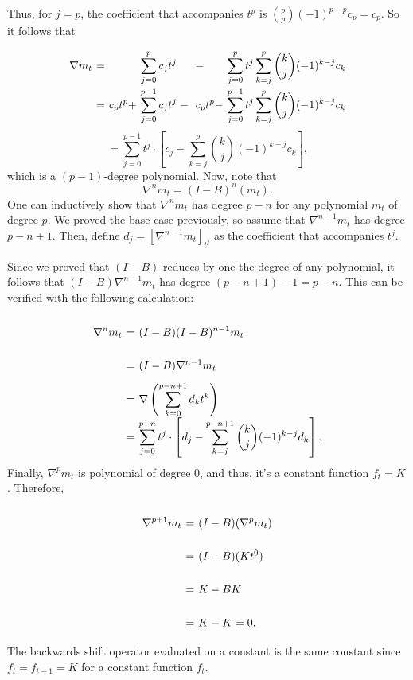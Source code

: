 Thus, for $j = p$, the coefficient that accompanies $t^p$ is $\binom{p}{p}(-1)^{p-p} c_p = c_p$. So it follows that
\[ \everymath{\displaystyle}
\arraycolsep=1.8pt\def\arraystretch{2.5}
\begin{array}{rcllll}
    \nabla m_t & = &  & \sum_{j = 0}^{p}c_j t^{j}  & - & \sum_{j = 0}^{p} t^j \sum_{k = j}^{p} \binom{k}{j} (-1)^{k-j} c_k\\
    & = & c_p t^p + & \sum_{j = 0}^{p-1}c_j t^{j} \; - \; & c_p t^p - & \sum_{j = 0}^{p-1} t^j \sum_{k = j}^{p} \binom{k}{j} (-1)^{k-j} c_k\\
\end{array}  \]
\[ = \sum_{j = 0}^{p-1} t^j \cdot \left[ c_j - \sum_{k = j}^{p} \binom{k}{j} (-1)^{k-j} c_k \right], \]
which is a $(p-1)$-degree polynomial. Now, note that
\[ \nabla^{n} m_{t} = (I-B)^{n}(m_t). \]
One can inductively show that $\nabla^n m_t$ has degree $p-n$ for any polynomial $m_t$ of degree $p$. We proved the base case previously, so assume that $\nabla^{n-1} m_t$ has degree $p-n+1$. Then, define $d_j = [\nabla^{n-1} m_t]_{t^j}$ as the coefficient that accompanies $t^j$. 

Since we proved that $(I-B)$ reduces by one the degree of any polynomial, it follows that $(I-B) \nabla^{n-1} m_t$ has degree $(p-n+1)-1 = p-n$. This can be verified with the following calculation: 
\[ \everymath{\displaystyle}
\arraycolsep=1.8pt\def\arraystretch{2.5}
\begin{array}{rcl}
    \nabla^{n} m_t & = & (I-B) (I-B)^{n-1} m_t\\
    & = & (I-B) \nabla^{n-1} m_t\\
    & = & \nabla \left( \sum_{k = 0}^{p-n+1} d_k t^k \right)\\
    & = & \sum_{j = 0}^{p-n} t^j \cdot \left[ d_j - \sum_{k = j}^{p-n+1} \binom{k}{j} (-1)^{k-j} d_k \right].
\end{array} \] 
Finally, $\nabla^{p}m_t$ is polynomial of degree 0, and thus, it's a constant function $f_t = K$. Therefore,
\[ \everymath{\displaystyle}
\arraycolsep=1.8pt\def\arraystretch{2.5}
\begin{array}{rcl}
    \nabla^{p+1} m_t & = & (I-B) (\nabla^{p}m_t)\\
    & = & (I-B) (Kt^0)\\
    & = & K - BK\\
    & = & K - K = 0.
\end{array} \]
The backwards shift operator evaluated on a constant is the same constant since $f_t = f_{t-1} = K$ for a constant function $f_t$.